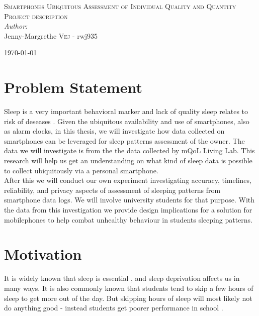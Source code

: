 \documentclass[12pt]{article}
\begin{document}

\begin{center}
\textsc{\Large Smartphones Ubiquitous Assessment of Individual Quality and Quantity}\\[0.5cm] 
\textsc{\large Project description}\\[0.5cm] 


\emph{Author:}
\\
Jenny-Margrethe \textsc{Vej} - rwj935\\ 
\vspace{10mm}

{\large \today}\\[3cm] 
\end{center}
\vspace{-20mm}

\section{Problem Statement}
Sleep is a very important behavioral marker and lack of quality sleep relates to risk of deseases
 \cite{Gumbiner2012}. Given the ubiquitous availability and use of smartphones, also as alarm 
 clocks, in this thesis, we will investigate how data collected on smartphones 
 can be leveraged for sleep patterns assessment of the owner. The data we will investigate is from the the data collected by  mQoL Living Lab\cite{mQOL}. This research will help us get an understanding on what kind of sleep data is possible to collect ubiquitously via a personal smartphone. \\

After this we will conduct our own experiment investigating accuracy, timelines, reliability, and privacy aspects of assessment of sleeping patterns from smartphone data logs. We will involve university students for that purpose. With the data from this investigation we provide design implications for a solution for mobilephones to help combat unhealthy behaviour in students sleeping patterns.

\section{Motivation}
It is widely known that sleep is essential \cite{Gumbiner2012}, and sleep deprivation affects 
us in many ways. It is also commonly known that students tend to skip a few hours of sleep to 
get more out of the day. But skipping hours of sleep will most likely not do anything good - instead
students get poorer performance in school \cite{Gilbert2010}. \\
\end{document}
